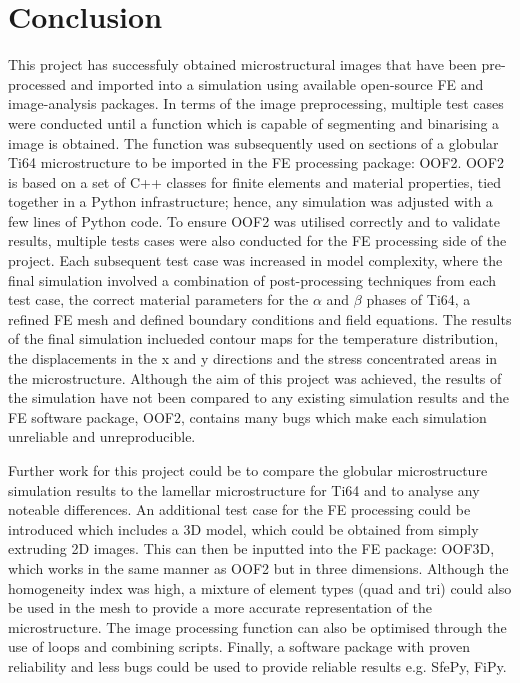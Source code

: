 \documentclass[report.tex]{subfiles}
\begin{document}
\section{Conclusion}

\noindent This project has successfuly obtained microstructural images that have been pre-processed 
 and imported into a simulation using available open-source FE and image-analysis packages. In terms of the image 
 preprocessing, multiple test cases were conducted until a function which is capable of segmenting and binarising a image
 is obtained. The function was subsequently used on sections of a globular Ti64 microstructure to be imported in the FE
 processing package: OOF2. OOF2 is based on a set of C++ classes for finite elements and material properties, 
 tied together in a Python infrastructure; hence, any simulation was adjusted with a few lines of Python code. 
 To ensure OOF2 was utilised correctly and to validate results, multiple tests 
 cases were also conducted for the FE processing side of the project. Each subsequent test case was increased in 
 model complexity, where the final simulation involved a combination of post-processing techniques from each test case, 
 the correct material parameters for the $\alpha$ and $\beta$ phases of Ti64, a refined FE mesh and defined boundary conditions and 
 field equations. The results of the final simulation inclueded contour maps for the temperature distribution,
 the displacements in the x and y directions and the stress concentrated areas in the microstructure. Although the aim of this 
 project was achieved, the results of the simulation have not been compared to any existing simulation results and the FE
 software package, OOF2, contains many bugs which make each simulation unreliable and unreproducible. \newline
 
\noindent Further work for this project could be to compare the globular microstructure simulation results to the lamellar 
microstructure for Ti64 and to analyse any noteable differences. An additional test case for the FE processing
could be introduced which includes a 3D model, which could be obtained from simply extruding 2D images. This can then 
be inputted into the FE package: OOF3D, which works in the same manner as OOF2 but in three dimensions. Although the 
homogeneity index was high, a mixture of element types (quad and tri) could also be used in the mesh to provide a 
more accurate representation of the microstructure. The image processing function can also be optimised through the use of
loops and combining scripts. Finally, a software package with proven reliability and less bugs could be used to provide 
reliable results e.g. SfePy, FiPy.
 
\end{document}
